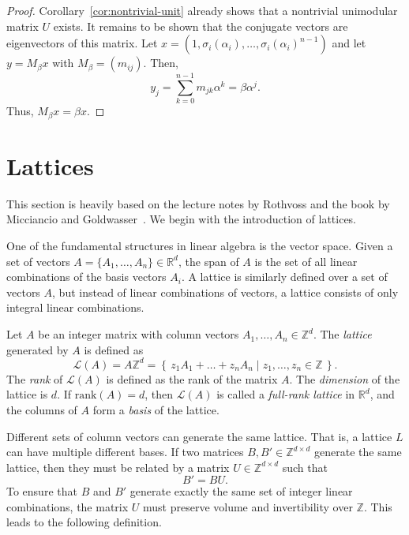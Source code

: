 \begin{proof}
  Corollary~\ref{cor:nontrivial-unit}
  already shows that a nontrivial unimodular matrix $U$ exists.
  It remains to be shown that the conjugate vectors are eigenvectors of this matrix.
  Let $x = (1, σ_i(α_i), …, σ_i(α_i)^{n-1})$ and let $y = M_β x$ with $M_β = (m_{ij})$.
  Then,
  \[
    y_j = \sum_{k=0}^{n-1} m_{jk} α^k = β α^j.
  \]
  Thus, $M_β x = β x$.
\end{proof}

\section{Lattices}

This section is heavily based on the lecture notes by Rothvoss
\cite{Rothvoss23} and the book by Micciancio and Goldwasser~\cite{Micciancio02}.
We begin with the introduction of lattices.

One of the fundamental structures in linear algebra is the vector space.
Given a set of vectors $A = \{A_1, …, A_n\} ∈ ℝ^d$, the span of $A$ is the set
of all linear combinations of the basis vectors $A_i$.
A lattice is similarly defined over a set of vectors $A$, but instead of linear
combinations of vectors, a lattice consists of only integral linear
combinations.

\begin{definition}
  Let $A$ be an integer matrix with column vectors $A_1, \dots, A_n ∈ ℤ^d$.
  The \emph{lattice} generated by $A$ is defined as
  \[
    \mathcal{L}(A) = A ℤ^d
    = \left\{\, z_1 A_1 + \dots + z_n A_n \mid z_1, \dots, z_n \in ℤ \,\right\}.
  \]
  The \emph{rank} of $\mathcal{L}(A)$ is defined as the rank of the matrix $A$.
  The \emph{dimension} of the lattice is $d$.
  If $\mathrm{rank}(A) = d$,
  then $\mathcal{L}(A)$ is called a \emph{full-rank lattice} in $ℝ^d$,
  and the columns of $A$ form a \emph{basis} of the lattice.
\end{definition}

Different sets of column vectors can generate the same lattice.
That is, a lattice $L$ can have multiple different bases.
If two matrices $B, B' \in \mathbb{Z}^{d \times d}$ generate the same lattice,
then they must be related by a matrix $U \in \mathbb{Z}^{d \times d}$
such that
\[
  B' = BU.
\]
To ensure that $B$ and $B'$ generate exactly the same set of integer linear combinations,
the matrix $U$ must preserve volume and invertibility over $ℤ$.
This leads to the following definition.

